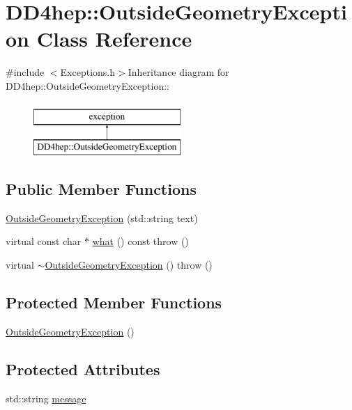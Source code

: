\hypertarget{class_d_d4hep_1_1_outside_geometry_exception}{
\section{DD4hep::OutsideGeometryException Class Reference}
\label{class_d_d4hep_1_1_outside_geometry_exception}
}


{\ttfamily \#include $<$Exceptions.h$>$}Inheritance diagram for DD4hep::OutsideGeometryException::\begin{figure}[H]
\begin{center}
\leavevmode
\includegraphics[height=2cm]{class_d_d4hep_1_1_outside_geometry_exception}
\end{center}
\end{figure}
\subsection*{Public Member Functions}
\begin{DoxyCompactItemize}
\item 
\hyperlink{class_d_d4hep_1_1_outside_geometry_exception_a11e9856846c7f8f2acb85f2774558422}{OutsideGeometryException} (std::string text)
\item 
virtual const char $\ast$ \hyperlink{class_d_d4hep_1_1_outside_geometry_exception_a4105c314a245db5f8ee7347dbcb4c27f}{what} () const   throw ()
\item 
virtual \hyperlink{class_d_d4hep_1_1_outside_geometry_exception_a7e9be9d6e116f089183a65ab413daa56}{$\sim$OutsideGeometryException} ()  throw ()
\end{DoxyCompactItemize}
\subsection*{Protected Member Functions}
\begin{DoxyCompactItemize}
\item 
\hyperlink{class_d_d4hep_1_1_outside_geometry_exception_afcb996b89fe54d62d9c20068cb342812}{OutsideGeometryException} ()
\end{DoxyCompactItemize}
\subsection*{Protected Attributes}
\begin{DoxyCompactItemize}
\item 
std::string \hyperlink{class_d_d4hep_1_1_outside_geometry_exception_aaa768606a23c1acf432ffe83a76f0991}{message}
\end{DoxyCompactItemize}


